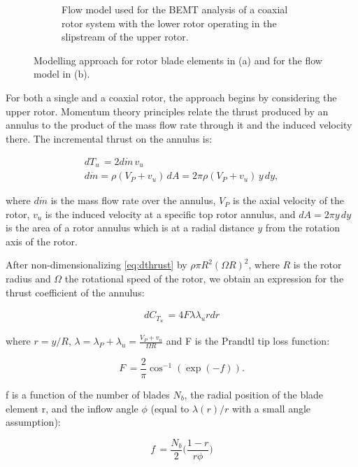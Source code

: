\begin{figure}[H]
\begin{subfigure}[t]{0.5\textwidth}
    \caption{Flow model used for the BEMT analysis of a coaxial rotor system with the lower rotor operating in the slipstream of the upper rotor. }
    \label{fig:disks}
\end{subfigure}
    \captionsetup{justification=centering}
    \caption{Modelling approach for rotor blade elements in (a) and for the flow model in (b).}
    \label{fig:BEMT}
\end{figure}


For both a single and a coaxial rotor, the approach begins by considering the upper rotor. Momentum theory principles relate the thrust produced by an annulus to the product of the mass flow rate through it and the induced velocity there. The incremental thrust on the annulus is:

\begin{align}
 dT_u\, = 2d\dot{m}\, v_u \label{eq:dthrust} \\
  d\dot{m} = \rho(V_P+v_u)\,dA = 2\pi\rho(V_P+v_u)\,y\, dy,
\end{align}

where $d\dot{m}$ is the mass flow rate over the annulus, $V_P$ is the axial velocity of the rotor, $v_u$ is the induced velocity at a specific top rotor annulus, and $dA = 2\pi y\, dy$ is the area of a rotor annulus which is at a radial distance $y$ from the rotation axis of the rotor.

After non-dimensionalizing \autoref{eq:dthrust} by $\rho \pi R^2 (\Omega R)^2$, where $R$ is the rotor radius and $\Omega$ the rotational speed of the rotor, we obtain an expression for the thrust coefficient of the annulus:

\begin{align}
 dC_{T_u}\, = 4 F \lambda \lambda_u r dr \label{eq:dCthrust} 
\end{align}

where $r=y/R$, $\lambda= \lambda_P+\lambda_u = \frac{V_P+v_u}{\Omega R}$ and F is the Prandtl tip loss function:

\begin{equation}
 F\, = \frac{2}{\pi} \cos^{-1}(\exp(-f)). \label{eq:prandtl} 
\end{equation}

f is a function of the number of blades $N_b$, the radial position of the blade element r, and the inflow angle $\phi$ (equal to $\lambda(r)/r$ with a small angle assumption):

\begin{equation}
 f\, = \frac{N_b}{2} \Big(\frac{1-r}{r \phi} \Big) \label{eq:f}
\end{equation}

